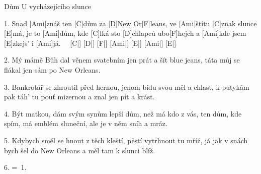 \begin{song}{Dům U vycházejícího slunce}{}

\begin{xverse}{1. }
Snad [Ami]znáš ten [C]dům za [D]New Or[F]leans,
ve [Ami]{}štítu [C]znak slunce [E]má,
je to [Ami]dům, kde [C]lká sto [D]chlapců ubo[F]hejch
a [Ami]kde jsem [E]zkejs' i [Ami]já. \ \  [C|]{} [D|]{} [F|]{} [Ami|]{} [E|]{} [Ami|]{} [E|]{}
\end{xverse}

\begin{xverse}{2. }
Mý mámě Bůh dal věnem svatebním
jen prát a šít blue jeans,
táta můj se flákal jen
sám po New Orleans.
\end{xverse}

\begin{xverse}{3. }
Bankrotář se zhroutil před hernou,
jenom bídu svou měl a chlast,
k putykám pak táh' tu pouť mizernou
a znal jen pít a krást.
\end{xverse}

\begin{xverse}{4. }
Být matkou, dám svým synům
lepší dům, než má kdo z vás,
ten dům, kde spím, má emblém sluneční,
ale je v něm sníh a mráz.
\end{xverse}

\begin{xverse}{5. }
Kdybych směl se hnout z těch kleští,
pěstí vytrhnout tu mříž,
já jak v snách bych šel do New Orleans
a měl tam k slunci blíž.
\end{xverse}

\begin{xverse}{6. }
=\ 1.
\end{xverse}

\end{song}

